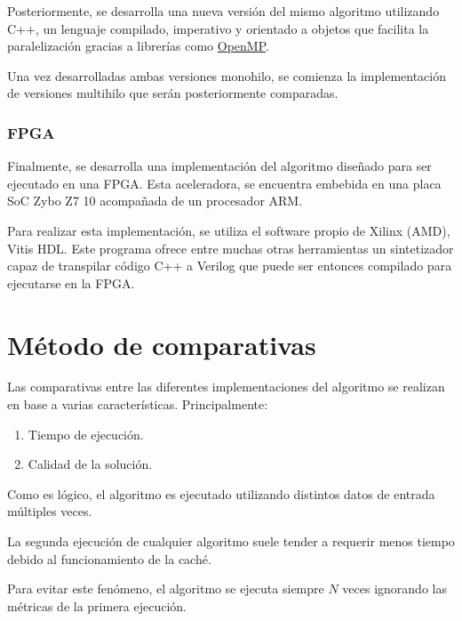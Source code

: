 Posteriormente, se desarrolla una nueva versión del mismo algoritmo
utilizando C++, un lenguaje compilado, imperativo y orientado a objetos
que facilita la paralelización gracias a librerías como 
\href{https://www.openmp.org/}{OpenMP}\@.

Una vez desarrolladas ambas versiones monohilo,
se comienza la implementación de versiones multihilo
que serán posteriormente comparadas.

\subsubsection{FPGA}

Finalmente, se desarrolla una implementación del algoritmo
diseñado para ser ejecutado en una FPGA\@.
Esta aceleradora, se encuentra embebida en una placa SoC
Zybo Z7 10 acompañada de un procesador ARM\@.

Para realizar esta implementación,
se utiliza el software propio de Xilinx (AMD),
Vitis HDL\@.
Este programa ofrece entre muchas otras herramientas
un sintetizador capaz de transpilar código C++ a Verilog
que puede ser entonces compilado
para ejecutarse en la FPGA\@.

\pagebreak

\section{Método de comparativas}

Las comparativas entre las diferentes implementaciones
del algoritmo se realizan en base a varias características.
Principalmente:

\begin{enumerate}[itemsep=0.25px]
    \item Tiempo de ejecución.
    \item Calidad de la solución.
\end{enumerate}

Como es lógico, el algoritmo es ejecutado utilizando
distintos datos de entrada múltiples veces.

\begin{notebox}
    La segunda ejecución de cualquier algoritmo suele tender a
    requerir menos tiempo debido al funcionamiento de la caché.
    
    Para evitar este fenómeno, el algoritmo se ejecuta
    siempre $N$ veces ignorando las métricas de la primera ejecución.
\end{notebox}

